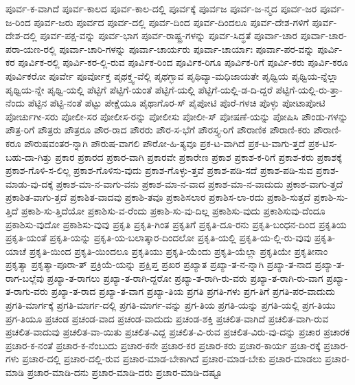 {ಪೂರ್ವ-ಕ-ವಾಗಿದೆ
ಪೂರ್ವ-ಕಾಲದ
ಪೂರ್ವ-ಕಾಲ-ದಲ್ಲಿ
ಪೂರ್ವಕ್ಕೆ
ಪೂರ್ವಜ
ಪೂರ್ವ-ಜ-ನ್ಮದ
ಪೂರ್ವ-ಜರ
ಪೂರ್ವ-ಜ-ರಿಂದ
ಪೂರ್ವ-ಜರು
ಪೂರ್ವದ
ಪೂರ್ವ-ದಲ್ಲಿ
ಪೂರ್ವ-ದಿಂದ
ಪೂರ್ವ-ದಿಂದಲೂ
ಪೂರ್ವ-ದೇಶ-ಗಳಿಗೆ
ಪೂರ್ವ-ದೇಶ-ದಲ್ಲಿ
ಪೂರ್ವ-ಪಕ್ಷ-ವನ್ನು
ಪೂರ್ವ-ಭಾಗ
ಪೂರ್ವ-ರಾಷ್ಟ್ರ-ಗಳನ್ನು
ಪೂರ್ವ-ಸಿದ್ಧತೆ
ಪೂರ್ವಾ-ಚಾರ
ಪೂರ್ವಾ-ಚಾರ-ಪರಾ-ಯಣ-ರಲ್ಲಿ
ಪೂರ್ವಾ-ಚಾರಿ-ಗಳನ್ನು
ಪೂರ್ವಾ-ಚಾರ್ಯರು
ಪೂರ್ವಾ-ಚಾರ್ಯಾಃ
ಪೂರ್ವಾ-ಪರ-ವನ್ನು
ಪೂರ್ವಿ-ಕರ
ಪೂರ್ವಿಕ-ರಲ್ಲಿ
ಪೂರ್ವಿ-ಕರ-ಲ್ಲಿ-ರುವ
ಪೂರ್ವಿಕ-ರಿಂದ
ಪೂರ್ವಿಕ-ರಿಗೂ
ಪೂರ್ವಿಕ-ರಿಗೆ
ಪೂರ್ವಿ-ಕರು
ಪೂರ್ವಿ-ಕರೂ
ಪೂರ್ವಿಕರೋ
ಪೂರ್ವೇ
ಪೂರ್ವೋಕ್ತ
ಪೃಥಕ್ತ್ವ-ವೆಲ್ಲಿ
ಪೃಥಗ್ಭಾವ
ಪೃಥಿವ್ಯಾ-ಮಧಿಜಾಯತೇ
ಪೃಥ್ವಿಯ
ಪೃಥ್ವಿಯ-ನ್ನೆಲ್ಲಾ
ಪೃಥ್ವಿಯ-ನ್ನೇ
ಪೃಥ್ವಿ-ಯಲ್ಲಿ
ಪೆಟ್ಟಿಗೆ
ಪೆಟ್ಟಿಗೆ-ಯಂತೆ
ಪೆಟ್ಟಿಗೆ-ಯಲ್ಲಿ
ಪೆಟ್ಟಿಗೆ-ಯಲ್ಲಿ-ಡ-ದಿ-ದ್ದರೆ
ಪೆಟ್ಟಿಗೆ-ಯಲ್ಲಿ-ರು-ತ್ತಾ-ನೆಂದು
ಪೆಟ್ಟಿನ
ಪೆಟ್ಟಿ-ನಂತೆ
ಪೆಟ್ಟು
ಪೇಕ್ಷೆಯೂ
ಪೈಥಾಗೊರ-ಸ್
ಪೈಪೋಟಿ
ಪೊರೆ-ಗಳಚಿ
ಪೊಳ್ಳು
ಪೋಟಾಪೋಟಿ
ಪೋರ್ಚುಗೀ-ಸರು
ಪೋಲೀ-ಸರ
ಪೋಲೀಸ-ರನ್ನು
ಪೋಲೀಸು
ಪೋಲೀ-ಸ್
ಪೋಷಣೆ-ಯನ್ನು
ಪೋಷಿಸಿ
ಪೌಂಡು-ಗಳನ್ನು
ಪೌತ್ರ-ರಿಗೆ
ಪೌತ್ರರು
ಪೌತ್ರರೂ
ಪೌರ-ರಾದ
ಪೌರರು
ಪೌರ-ಸ-ಭೆಗೆ
ಪೌರಸ್ತ್ಯ-ರಿಗೆ
ಪೌರಾಣಿಕ
ಪೌರಾಣಿ-ಕರು
ಪೌರಾಣಿ-ಕರೂ
ಪೌರುಷವಂತರ-ನ್ನಾಗಿ
ಪೌರುಷ-ವಾಗಲಿ
ಪೌರೋ-ಹಿ-ತ್ಯವೂ
ಪ್ರಕ-ಟ-ವಾಗಿದೆ
ಪ್ರಕ-ಟ-ವಾಗು-ತ್ತದೆ
ಪ್ರಕ-ಟಿಸ-ಬಹು-ದಾ-ಗಿತ್ತು
ಪ್ರಕಾರ
ಪ್ರಕಾರದ
ಪ್ರಕಾರ-ವಾಗಿ
ಪ್ರಕಾರವೇ
ಪ್ರಕಾರೇಣ
ಪ್ರಕಾಶ
ಪ್ರಕಾಶ-ಕ-ರಿಗೆ
ಪ್ರಕಾಶ-ಕರು
ಪ್ರಕಾಶಕ್ಕೆ
ಪ್ರಕಾಶ-ಗೊಳಿ-ಸ-ಲಿಲ್ಲ
ಪ್ರಕಾಶ-ಗೊಳಿಸು-ವುದು
ಪ್ರಕಾಶ-ಗೊಳ್ಳು-ತ್ತವೆ
ಪ್ರಕಾಶ-ಪಡಿ-ಸದೆ
ಪ್ರಕಾಶ-ಪಡಿ-ಸುವ
ಪ್ರಕಾಶ-ಮಾಡು-ವು-ದಕ್ಕೆ
ಪ್ರಕಾಶ-ಮಾ-ನ-ವಾಗು-ವನು
ಪ್ರಕಾಶ-ಮಾ-ನ-ವಾದ
ಪ್ರಕಾಶ-ಮಾ-ನ-ವಾದುದು
ಪ್ರಕಾಶ-ವಾಗು-ತ್ತದೆ
ಪ್ರಕಾಶಿತ-ವಾಗು-ತ್ತದೆ
ಪ್ರಕಾಶಿತ-ವಾದವು
ಪ್ರಕಾಶಿ-ತವೂ
ಪ್ರಕಾಶಿಸಲಾರ
ಪ್ರಕಾಶಿಸ-ಲಾ-ರದು
ಪ್ರಕಾಶಿ-ಸುತ್ತದೆ
ಪ್ರಕಾಶಿ-ಸು-ತ್ತಿದೆ
ಪ್ರಕಾಶಿ-ಸು-ತ್ತಿದೆಯೋ
ಪ್ರಕಾಶಿಸು-ವ-ರೆಂದು
ಪ್ರಕಾಶಿ-ಸು-ವು-ದಿಲ್ಲ
ಪ್ರಕಾಶಿಸು-ವುದು
ಪ್ರಕಾಶಿಸುವು-ದೆಂದೂ
ಪ್ರಕಾಶಿಸು-ವುದೋ
ಪ್ರಕಾಶಿಸು-ವುವು
ಪ್ರಕೃತಿ
ಪ್ರಕೃತಿ-ಗಿಂತ
ಪ್ರಕೃತಿಗೆ
ಪ್ರಕೃತಿ-ದೂ-ರನು
ಪ್ರಕೃತಿ-ಬಂಧನ-ದಿಂದ
ಪ್ರಕೃತಿಯ
ಪ್ರಕೃತಿ-ಯಂತೆ
ಪ್ರಕೃತಿ-ಯನ್ನು
ಪ್ರಕೃತಿ-ಯ-ಬಲಾತ್ಕಾರ-ದಿಂದಲೋ
ಪ್ರಕೃತಿ-ಯಲ್ಲಿ
ಪ್ರಕೃತಿ-ಯ-ಲ್ಲಿ-ರು-ವುವು
ಪ್ರಕೃತಿ-ಯಾಚೆ
ಪ್ರಕೃತಿ-ಯಿಂದ
ಪ್ರಕೃತಿ-ಯಿಂದಲೂ
ಪ್ರಕೃತಿಯು
ಪ್ರಕೃತಿ-ಯೆಂದು
ಪ್ರಕೃತಿ-ಯೆಲ್ಲಾ
ಪ್ರಕೃತಿಯೇ
ಪ್ರಕೃತೀನಾಂ
ಪ್ರಕೃತ್ಯಾ
ಪ್ರಕೃತ್ಯಾ-ಪೂರಾ-ತ್
ಪ್ರಕ್ರಿಯೆ-ಯನ್ನು
ಪ್ರಕ್ಷಿಪ್ತ
ಪ್ರಖರ
ಪ್ರಖ್ಯಾತ
ಪ್ರಖ್ಯಾ-ತ-ನ-ನ್ನಾಗಿ
ಪ್ರಖ್ಯಾ-ತ-ನಾದ
ಪ್ರಖ್ಯಾ-ತ-ರಾಗ-ಬಲ್ಲೆವು
ಪ್ರಖ್ಯಾ-ತ-ರಾಗಲು
ಪ್ರಖ್ಯಾ-ತ-ರಾಗಿ-ದ್ದರೋ
ಪ್ರಖ್ಯಾ-ತ-ರಾಗಿ-ರು-ವರು
ಪ್ರಖ್ಯಾ-ತ-ರಾಗಿ-ರು-ವಾಗ
ಪ್ರಖ್ಯಾ-ತ-ರಾಗು-ವರು
ಪ್ರಖ್ಯಾ-ತ-ರಾದ
ಪ್ರಖ್ಯಾ-ತ-ವಾಗ
ಪ್ರಖ್ಯಾ-ತಿಯ
ಪ್ರಗತಿ
ಪ್ರಗತಿ-ಗಳು
ಪ್ರಗ-ತಿಗೆ
ಪ್ರಗತಿ-ಪರ-ವಾದುದು
ಪ್ರಗತಿ-ಮಾರ್ಗಕ್ಕೆ
ಪ್ರಗತಿ-ಮಾರ್ಗ-ದಲ್ಲಿ
ಪ್ರಗತಿ-ಮಾರ್ಗ-ವನ್ನು
ಪ್ರಗ-ತಿಯ
ಪ್ರಗತಿ-ಯನ್ನು
ಪ್ರಗತಿ-ಯಲ್ಲಿ
ಪ್ರಗ-ತಿಯು
ಪ್ರಗ-ತಿಯೂ
ಪ್ರಚಂಡ
ಪ್ರಚಂಡ-ವಾದ
ಪ್ರಚಂಡ-ವಾದುದು
ಪ್ರಚಂಡ-ಶಕ್ತಿ
ಪ್ರಚಲಿತ-ವಾಗಿದೆ
ಪ್ರಚಲಿತ-ವಾಗಿ-ರುವ
ಪ್ರಚಲಿತ-ವಾದುವು
ಪ್ರಚಲಿತ-ವಾ-ಯಿತು
ಪ್ರಚಲಿತ-ವಿದ್ದ
ಪ್ರಚಲಿತ-ವಿ-ರುವ
ಪ್ರಚಲಿತ-ವಿರು-ವು-ದನ್ನು
ಪ್ರಚಾರ
ಪ್ರಚಾರಕ
ಪ್ರಚಾರ-ಕ-ನಂತೆ
ಪ್ರಚಾರ-ಕ-ನೆಂಬುದು
ಪ್ರಚಾರ-ಕನೇ
ಪ್ರಚಾರ-ಕರ
ಪ್ರಚಾರ-ಕರು
ಪ್ರಚಾರ-ಕಾರ್ಯ
ಪ್ರಚಾ-ರಕ್ಕೆ
ಪ್ರಚಾರ-ಗಳು
ಪ್ರಚಾರ-ದಲ್ಲಿ
ಪ್ರಚಾರ-ದಲ್ಲಿ-ರುವ
ಪ್ರಚಾರ-ಮಾಡ-ಬೇಕಾಗಿದೆ
ಪ್ರಚಾರ-ಮಾಡ-ಬೇಕು
ಪ್ರಚಾರ-ಮಾಡಲು
ಪ್ರಚಾರ-ಮಾಡಿ
ಪ್ರಚಾರ-ಮಾಡಿ-ದನು
ಪ್ರಚಾರ-ಮಾಡಿ-ದರು
ಪ್ರಚಾರ-ಮಾಡಿ-ದಷ್ಟೂ
}
